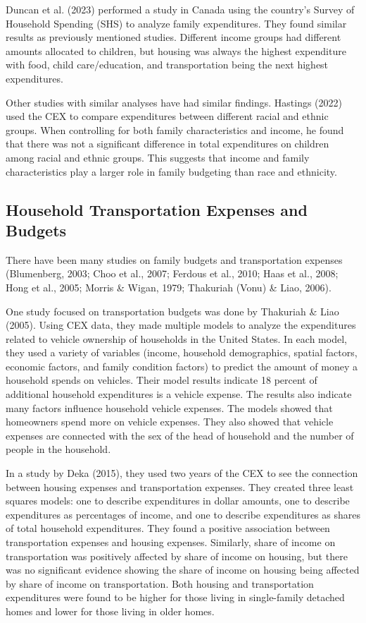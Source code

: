 \documentclass[
]{agujournal2019}
\begin{document}
Duncan et al. (2023) performed a study in Canada using the country's
Survey of Household Spending (SHS) to analyze family expenditures. They
found similar results as previously mentioned studies. Different income
groups had different amounts allocated to children, but housing was
always the highest expenditure with food, child care/education, and
transportation being the next highest expenditures.

Other studies with similar analyses have had similar findings. Hastings
(2022) used the CEX to compare expenditures between different racial and
ethnic groups. When controlling for both family characteristics and
income, he found that there was not a significant difference in total
expenditures on children among racial and ethnic groups. This suggests
that income and family characteristics play a larger role in family
budgeting than race and ethnicity.

\subsection{Household Transportation Expenses and
Budgets}\label{household-transportation-expenses-and-budgets}

There have been many studies on family budgets and transportation
expenses (Blumenberg, 2003; Choo et al., 2007; Ferdous et al., 2010;
Haas et al., 2008; Hong et al., 2005; Morris \& Wigan, 1979; Thakuriah
(Vonu) \& Liao, 2006).

One study focused on transportation budgets was done by Thakuriah \&
Liao (2005). Using CEX data, they made multiple models to analyze the
expenditures related to vehicle ownership of households in the United
States. In each model, they used a variety of variables (income,
household demographics, spatial factors, economic factors, and family
condition factors) to predict the amount of money a household spends on
vehicles. Their model results indicate 18 percent of additional
household expenditures is a vehicle expense. The results also indicate
many factors influence household vehicle expenses. The models showed
that homeowners spend more on vehicle expenses. They also showed that
vehicle expenses are connected with the sex of the head of household and
the number of people in the household.

In a study by Deka (2015), they used two years of the CEX to see the
connection between housing expenses and transportation expenses. They
created three least squares models: one to describe expenditures in
dollar amounts, one to describe expenditures as percentages of income,
and one to describe expenditures as shares of total household
expenditures. They found a positive association between transportation
expenses and housing expenses. Similarly, share of income on
transportation was positively affected by share of income on housing,
but there was no significant evidence showing the share of income on
housing being affected by share of income on transportation. Both
housing and transportation expenditures were found to be higher for
those living in single-family detached homes and lower for those living
in older homes.
\end{document}

